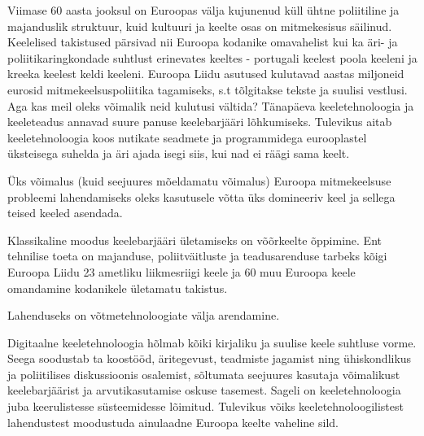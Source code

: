 \documentclass[]{../metanetpaper}
\begin{document}
\begin{multicols}{2}
Viimase 60 aasta jooksul on Euroopas välja kujunenud küll ühtne poliitiline ja majanduslik struktuur, kuid kul\-tuuri ja keelte osas on mitme\-kesisus säilinud. 
Keelelised takistused pärsivad nii Euroopa kodanike omavahelist kui ka äri- ja poliitikaringkondade suhtlust erinevates keeltes - portugali keelest poola keeleni ja kreeka keelest keldi keeleni.
Euroopa Lii\-du asutused kulutavad aastas miljoneid eurosid mitmekeelsuspoliitika tagamiseks, s.t tõlgitakse tekste ja suulisi vestlusi. 
Aga kas meil oleks võimalik neid kulutusi vältida?
Tänapäeva keeletehnoloogia ja keeleteadus annavad suure panuse keelebarjääri lõhkumiseks. 
Tulevikus aitab keeletehno\-loogia koos nutikate seadmete ja programmidega eurooplastel üks\-teisega suhelda ja äri ajada isegi siis, kui nad ei räägi sama keelt.


Üks võimalus (kuid seejuures mõeldamatu võimalus) Euroopa mitmekeelsuse probleemi lahendamiseks oleks kasutusele võtta üks domineeriv keel ja sellega teised keeled asendada. 

Klassikaline moodus keelebarjääri ületamiseks on võõrkeelte õppimine. 
Ent tehnilise toeta on majanduse, poliitväitluste ja teadusarenduse tarbeks kõigi Euroopa Liidu 23 ametliku liikmesriigi keele ja 60 muu Euroopa keele omandamine kodanikele ületamatu takistus.

Lahenduseks on võtmetehnoloogiate välja arendamine. 

Digitaalne keeletehnoloogia hõlmab kõiki kirjaliku ja suulise keele suhtluse vorme. 
Seega soodustab ta koostööd, äritegevust, teadmiste jagamist ning ühiskondlikus ja poliitilises diskussioonis osalemist, sõltumata seejuures kasutaja võimalikust keelebarjäärist ja arvutikasutamise oskuse tasemest.
Sageli on keeletehno\-loogia juba keerulistesse süsteemi\-desse lõimitud.
Tulevikus võiks keeletehnoloogilistest lahendustest moodustuda ainulaadne Euroopa keelte vaheline sild.


\end{multicols}
\end{document}
